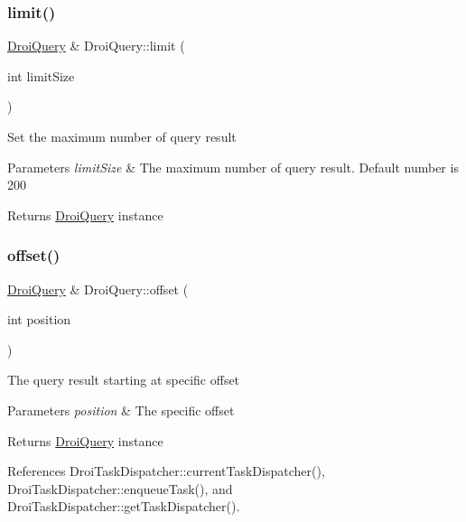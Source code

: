 \subsubsection{\texorpdfstring{limit()}{limit()}}
{\footnotesize\ttfamily \hyperlink{class_droi_query}{Droi\+Query} \& Droi\+Query\+::limit (\begin{DoxyParamCaption}\item[{int}]{limit\+Size }\end{DoxyParamCaption})}

Set the maximum number of query result 
\begin{DoxyParams}{Parameters}
{\em limit\+Size} & The maximum number of query result. Default number is 200 \\
\hline
\end{DoxyParams}
\begin{DoxyReturn}{Returns}
\hyperlink{class_droi_query}{Droi\+Query} instance 
\end{DoxyReturn}
\mbox{\label{class_droi_query_a15a8a0951254209f32df45d1a2265915}} 
\subsubsection{\texorpdfstring{offset()}{offset()}}
{\footnotesize\ttfamily \hyperlink{class_droi_query}{Droi\+Query} \& Droi\+Query\+::offset (\begin{DoxyParamCaption}\item[{int}]{position }\end{DoxyParamCaption})}

The query result starting at specific offset 
\begin{DoxyParams}{Parameters}
{\em position} & The specific offset \\
\hline
\end{DoxyParams}
\begin{DoxyReturn}{Returns}
\hyperlink{class_droi_query}{Droi\+Query} instance 
\end{DoxyReturn}


References Droi\+Task\+Dispatcher\+::current\+Task\+Dispatcher(), Droi\+Task\+Dispatcher\+::enqueue\+Task(), and Droi\+Task\+Dispatcher\+::get\+Task\+Dispatcher().

\mbox{\label{class_droi_query_ad1e30a2f5bae1314db3b2b88f36b80f5}} 
